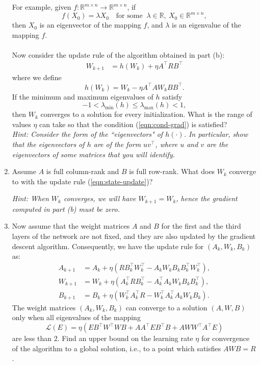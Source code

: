 \begin{enumerate}
For example, given $f : \mathbb R^{m \times n} \to \mathbb R^{m \times n}$, if
\[ f(X_0) = \lambda X_0  \quad \text{for some } \ \lambda \in \mathbb R, \ X_0 \in \mathbb R^{m \times n}, \]
then $X_0$ is an eigenvector of the mapping $f$, and $\lambda$ is an eigenvalue of the mapping $f$. 
\\\\
Now consider the update rule of the algorithm obtained in part (b):
    \begin{align} W_{k+1} 
    & = h(W_k) + \eta A^\top RB^\top \label{eqn:state-update}
    \end{align}
    where we define
    \[ h(W_k) = W_k - \eta A^\top A W_k BB^\top.\]
    If the minimum and maximum eigenvalues of $h$ satisfy
    \begin{equation} -1 < \lambda_\text{min}(h) \le \lambda_\text{max}(h) < 1,
    \label{eqn:cond-grad}
    \end{equation}
    then $W_k$ converges to a solution for every initialization. What is the range of values $\eta$ can take so that the condition (\ref{eqn:cond-grad}) is satisfied?\\
    \emph{Hint: Consider the form of the ``eigenvectors" of $h(\cdot)$. In particular, show that the eigenvectors of $h$ are of the form $uv^\top$, where $u$ and $v$ are the eigenvectors of some matrices that you will identify.}

\sol{}
    
    \item Assume $A$ is full column-rank and $B$ is full row-rank. What does $W_k$ converge to with the update rule (\ref{eqn:state-update})?
    
    \textit{Hint: When $W_k$ converges, we will have $W_{k+1} = W_{k}$, hence the gradient computed in part (b) must be zero.}
    
    \sol{}
    
    \item Now assume that the weight matrices $A$ and $B$ for the first and the third layers of the network are not fixed, and they are also updated by the gradient descent algorithm. Consequently, we have the update rule for $(A_k, W_k, B_k)$ as:
    \begin{align*}
        A_{k+1} & = A_k + \eta \left( RB_k^\top W_k^\top - A_kW_kB_kB_k^\top W_k^\top\right), \\
        W_{k+1} & = W_k + \eta \left( A_k^\top RB_k^\top - A_k^\top A_kW_kB_kB_k^\top \right), \\
        B_{k+1} & = B_k + \eta \left(
        W_k^\top A_k^\top R - W_k^\top A_k^\top A_k W_k B_k 
        \right).
    \end{align*}
    The weight matrices $(A_k, W_k, B_k)$ can converge to a solution $(A, W, B)$ only when all eigenvalues of the mapping
    \[
    \mathcal L(E) = \eta \left(
    EB^\top W^\top WB + AA^\top E B^\top B + AWW^\top A^\top E
    \right)
    \]
    are less than 2. Find an upper bound on the learning rate $\eta$ for convergence of the algorithm to a global solution, i.e., to a point which satisfies $AWB = R$.
    

\end{enumerate}
